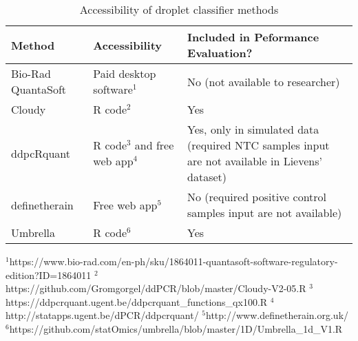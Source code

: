 \bgroup
\def\arraystretch{2}%
\begin{table}[]
    \caption{Accessibility of droplet classifier methods}
    \begin{tabularx}{\textwidth}{p{2.7cm}Xp{5.5cm}}
    \toprule
    \textbf{Method}    & \textbf{Accessibility}                 & \textbf{Included in Peformance Evaluation?} \\ 
    \midrule
    Bio-Rad QuantaSoft & Paid desktop software\(^1\)            & No \newline (not available to researcher)                                                         \\ 
    Cloudy             & R code\(^2\)                           & Yes \newline                                                                                                     \\ 
    ddpcRquant         & R code\(^3\) and free web app\(^4\)    & Yes, only in simulated data \newline (required NTC samples input are not available in Lievens’ dataset) \\ 
    definetherain      & Free web app\(^5\)                     & No \newline (required positive control samples input are not available)                                 \\ 
    Umbrella           & R code\(^6\)                           & Yes                                                                                                     \\ 
    \bottomrule
    \end{tabularx}
    {\scriptsize 
    \(^1\)https://www.bio-rad.com/en-ph/sku/1864011-quantasoft-software-regulatory-edition?ID=1864011 \newline
    \(^2\)https://github.com/Gromgorgel/ddPCR/blob/master/Cloudy-V2-05.R \newline
    \(^3\)https://ddpcrquant.ugent.be/ddpcrquant\_functions\_qx100.R \newline
    \(^4\)http://statapps.ugent.be/dPCR/ddpcrquant/\newline
    \(^5\)http://www.definetherain.org.uk/ \newline
    \(^6\)https://github.com/statOmics/umbrella/blob/master/1D/Umbrella\_1d\_V1.R
    }
\end{table}
\egroup


